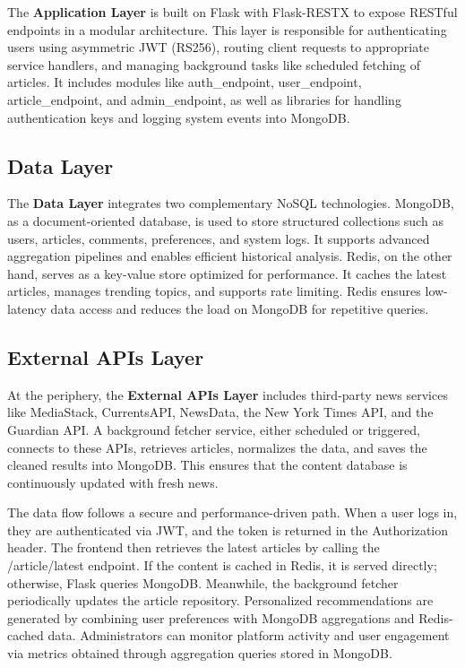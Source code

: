 The \textbf{Application Layer} is built on Flask with Flask-RESTX to expose RESTful endpoints in a modular architecture.
This layer is responsible for authenticating users using asymmetric JWT (RS256), routing client requests to appropriate service handlers, and managing background tasks like scheduled fetching of articles.
It includes modules like auth\_endpoint, user\_endpoint, article\_endpoint, and admin\_endpoint, as well as libraries for handling authentication keys and logging system events into MongoDB\@.

\subsection{Data Layer}\label{subsec:data-layer}

The \textbf{Data Layer} integrates two complementary NoSQL technologies.
MongoDB, as a document-oriented database, is used to store structured collections such as users, articles, comments, preferences, and system logs.
It supports advanced aggregation pipelines and enables efficient historical analysis.
Redis, on the other hand, serves as a key-value store optimized for performance.
It caches the latest articles, manages trending topics, and supports rate limiting.
Redis ensures low-latency data access and reduces the load on MongoDB for repetitive queries.

\subsection{External APIs Layer}\label{subsec:external-apis-layer}

At the periphery, the \textbf{External APIs Layer} includes third-party news services like MediaStack, CurrentsAPI, NewsData, the New York Times API, and the Guardian API\@.
A background fetcher service, either scheduled or triggered, connects to these APIs, retrieves articles, normalizes the data, and saves the cleaned results into MongoDB\@.
This ensures that the content database is continuously updated with fresh news.

\vspace{2cm}

The data flow follows a secure and performance-driven path.
When a user logs in, they are authenticated via JWT, and the token is returned in the Authorization header.
The frontend then retrieves the latest articles by calling the /article/latest endpoint.
If the content is cached in Redis, it is served directly; otherwise, Flask queries MongoDB. Meanwhile, the background fetcher periodically updates the article repository.
Personalized recommendations are generated by combining user preferences with MongoDB aggregations and Redis-cached data.
Administrators can monitor platform activity and user engagement via metrics obtained through aggregation queries stored in MongoDB\@.


